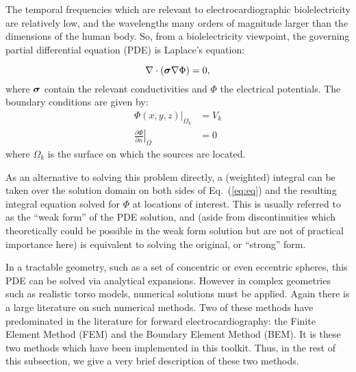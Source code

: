 The temporal frequencies which are relevant to electrocardiographic
biolelectricity are relatively low, and the wavelengths many orders of
magnitude larger than the dimensions of the human body. So, from a
biolelectricity viewpoint, the governing partial differential equation (PDE)
is Laplace's equation:

\begin{equation} \nabla \cdot (\mbox{\boldmath $\sigma$} \nabla \Phi) = 0, \label{eq:eq}
\end{equation}
\noindent where $\mbox{\boldmath $\sigma$}$ contain the relevant conductivities and $\Phi$ the
electrical potentials. The boundary conditions are given by:
\begin{align} \Phi(x,y,z)|_{\Omega_k} &= V_k\\ \left. \frac{\partial
\Phi}{\partial n} \right|_\Omega &= 0 \label{eq:bc}
\end{align}
\noindent where $\Omega_{k}$ is the surface on which the sources are located.

As an alternative to solving this problem directly, a (weighted) integral
can be taken over the solution domain on both sides of Eq.~(\ref{eq:eq})
and the resulting integral equation solved for $\Phi$ at locations of
interest. This is usually referred to as the ``weak form'' of the PDE
solution, and (aside from discontinuities which theoretically could be
possible in the weak form solution but are not of practical importance
here) is equivalent to solving the original, or ``strong'' form.

In a tractable geometry, such as a set of concentric or even eccentric
spheres, this PDE can be solved via analytical expansions. However in
complex geometries such as realistic torso models, numerical solutions must
be applied. Again there is a large literature on such numerical
methods. Two of these methods have predominated in the literature for
forward electrocardiography: the Finite Element Method (FEM) and the
Boundary Element Method (BEM). It is these two methods which have been
implemented in this toolkit. Thus, in the rest of this subsection, we give a
very brief description of these two methods.

